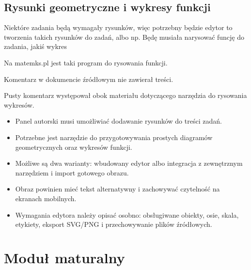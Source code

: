 \documentclass[12pt,a4paper]{report}
\begin{document}
\section{Rysunki geometryczne i wykresy funkcji}
\begin{ElearnReviewComment}[title={Komentarz nr 14 -- Anna Kogut, 2026-07-22}]
Niektóre zadania będą wymagały rysunków, więc potrzebny będzie edytor to tworzenia takich rysunków do zadań, albo np. Będę musiała narysować funcję do zadania, jakiś wykres

Na matemks.pl jest taki program do rysowania funkcji.
\end{ElearnReviewComment}
\begin{ElearnReviewComment}[title={Komentarz nr 15 -- Anna Kogut, 2026-07-22}]
Komentarz w dokumencie źródłowym nie zawierał treści.

Pusty komentarz występował obok materiału dotyczącego narzędzia do rysowania wykresów.
\end{ElearnReviewComment}
\begin{ElearnRequirement}[title={Wymagania wynikające z komentarza}]
\begin{itemize}
  \item Panel autorski musi umożliwiać dodawanie rysunków do treści zadań.
  \item Potrzebne jest narzędzie do przygotowywania prostych diagramów geometrycznych oraz wykresów funkcji.
  \item Możliwe są dwa warianty: wbudowany edytor albo integracja z zewnętrznym narzędziem i import gotowego obrazu.
  \item Obraz powinien mieć tekst alternatywny i zachowywać czytelność na ekranach mobilnych.
  \item Wymagania edytora należy opisać osobno: obsługiwane obiekty, osie, skala, etykiety, eksport SVG/PNG i przechowywanie plików źródłowych.
\end{itemize}
\end{ElearnRequirement}
\clearpage
\chapter{Moduł maturalny}
\end{document}
